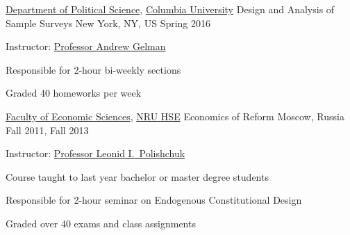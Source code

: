

\begin{cventries}

  \cventry
    {\href{http://polisci.columbia.edu/}{Department of Political Science}, \href{http://www.columbia.edu/}{Columbia University}} %
    {Design and Analysis of Sample Surveys} %
    {New York, NY, US} %
    {Spring 2016} %
    {
      \begin{cvitems} %
        \item {Instructor: \href{http://www.stat.columbia.edu/~gelman/}{Professor Andrew Gelman}}
        \item {Responsible for 2-hour bi-weekly sections}
        \item {Graded 40 homeworks per week}
      \end{cvitems}
    }

  \cventry
    {\href{https://economics.hse.ru/en/}{Faculty of Economic Sciences}, \href{http://www.hse.ru/en/}{NRU HSE}} %
    {Economics of Reform} %
    {Moscow, Russia} %
    {Fall 2011, Fall 2013} %
    {
      \begin{cvitems} %
        \item {Instructor: \href{https://www.hse.ru/en/org/persons/65104}{Professor Leonid I.~Polishchuk}}
        \item {Course taught to last year bachelor or master degree students}
        \item {Responsible for 2-hour seminar on Endogenous Constitutional Design}
        \item {Graded over 40 exams and class assignments}
      \end{cvitems}
    }


\end{cventries}
